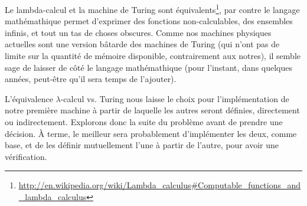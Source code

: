 \documentclass{article}
\begin{document}
Le lambda-calcul et la machine de Turing sont équivalents\footnote{\url{http://en.wikipedia.org/wiki/Lambda_calculus\#Computable_functions_and_lambda_calculus}}, par contre le langage mathémathique permet d'exprimer des fonctions non-calculables, des ensembles infinis, et tout un tas de choses obscures. Comme nos machines physiques actuelles sont une version bâtarde des machines de Turing (qui n'ont pas de limite sur la quantité de mémoire disponible, contrairement aux notres), il semble sage de laisser de côté le langage mathémathique (pour l'instant, dans quelques années, peut-être qu'il sera temps de l'ajouter).

L'équivalence $\lambda$-calcul vs. Turing nous laisse le choix pour l'implémentation de notre première machine à partir de laquelle les autres seront définies, directement ou indirectement. Explorons donc la suite du problème avant de prendre une décision. À terme, le meilleur sera probablement d'implémenter les deux, comme base, et de les définir mutuellement l'une à partir de l'autre, pour avoir une vérification.
\end{document}
